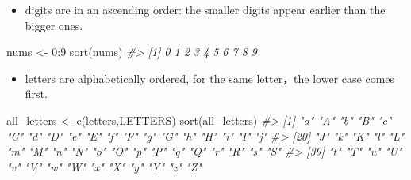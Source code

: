 \documentclass[
]{book}
\newenvironment{Shaded}{\begin{snugshade}}{\end{snugshade}}
\newcommand{\CommentTok}[1]{\textcolor[rgb]{0.56,0.35,0.01}{\textit{#1}}}
\newcommand{\DecValTok}[1]{\textcolor[rgb]{0.00,0.00,0.81}{#1}}
\newcommand{\FunctionTok}[1]{\textcolor[rgb]{0.00,0.00,0.00}{#1}}
\newcommand{\NormalTok}[1]{#1}
\newcommand{\OtherTok}[1]{\textcolor[rgb]{0.56,0.35,0.01}{#1}}
\newcommand{\SpecialCharTok}[1]{\textcolor[rgb]{0.00,0.00,0.00}{#1}}
\newcommand{\StringTok}[1]{\textcolor[rgb]{0.31,0.60,0.02}{#1}}
\providecommand{\tightlist}{%
  \setlength{\itemsep}{0pt}\setlength{\parskip}{0pt}}
\begin{document}
\begin{Shaded}
\end{Shaded}

\begin{itemize}
\tightlist
\item
  digits are in an ascending order: the smaller digits appear earlier than the bigger ones.
\end{itemize}

\begin{Shaded}
\begin{Highlighting}[]
\NormalTok{nums }\OtherTok{\textless{}{-}} \DecValTok{0}\SpecialCharTok{:}\DecValTok{9}
\FunctionTok{sort}\NormalTok{(nums)}
\CommentTok{\#\textgreater{}  [1] 0 1 2 3 4 5 6 7 8 9}
\end{Highlighting}
\end{Shaded}

\begin{itemize}
\tightlist
\item
  letters are alphabetically ordered, for the same letter，the lower case comes first.
\end{itemize}

\begin{Shaded}
\begin{Highlighting}[]
\NormalTok{all\_letters }\OtherTok{\textless{}{-}} \FunctionTok{c}\NormalTok{(letters,LETTERS)}
\FunctionTok{sort}\NormalTok{(all\_letters)}
\CommentTok{\#\textgreater{}  [1] "a" "A" "b" "B" "c" "C" "d" "D" "e" "E" "f" "F" "g" "G" "h" "H" "i" "I" "j"}
\CommentTok{\#\textgreater{} [20] "J" "k" "K" "l" "L" "m" "M" "n" "N" "o" "O" "p" "P" "q" "Q" "r" "R" "s" "S"}
\CommentTok{\#\textgreater{} [39] "t" "T" "u" "U" "v" "V" "w" "W" "x" "X" "y" "Y" "z" "Z"}
\end{Highlighting}
\end{Shaded}
\end{document}
